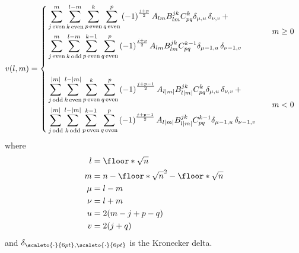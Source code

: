 \begin{align} 
    \label{eq:pn}
    v(l, m) &=
    \begin{dcases}
        \!\begin{aligned}%
            &
                \sum_{j\, \mathrm{even}}^m
                \sum_{k\, \mathrm{even}}^{l-m}
                \sum_{p\,\mathrm{even}}^{k}
                \sum_{q\,\mathrm{even}}^p
                \left(-1\right)^{\frac{j+p}{2}}
                A_{lm}
                B_{lm}^{jk}
                C_{pq}^{k}
                \delta_{\mu, u} \, \delta_{\nu, v}
            \, + \\
            &
                \sum_{j\, \mathrm{even}}^m
                \sum_{k\, \mathrm{odd}}^{l-m}
                \sum_{p\,\mathrm{even}}^{k - 1}
                \sum_{q\,\mathrm{even}}^p
                \left(-1\right)^{\frac{j+p}{2}}
                A_{lm}
                B_{lm}^{jk}
                C_{pq}^{k - 1}
                \delta_{\mu-1, u} \, \delta_{\nu-1, v}
       \end{aligned}
       &
       \quad m \ge 0 \\
       \\
       \!\begin{aligned}%
           &
               \sum_{j\, \mathrm{odd}}^{|m|}
               \sum_{k\, \mathrm{even}}^{l-|m|}
               \sum_{p\,\mathrm{even}}^{k}
               \sum_{q\,\mathrm{even}}^p
               \left(-1\right)^{\frac{j+p-1}{2}}
               A_{l|m|}
               B_{l|m|}^{jk}
               C_{pq}^{k}
               \delta_{\mu, u} \, \delta_{\nu, v}
           \, + \\
           &
               \sum_{j\, \mathrm{odd}}^{|m|}
               \sum_{k\, \mathrm{odd}}^{l-|m|}
               \sum_{p\,\mathrm{even}}^{k - 1}
               \sum_{q\,\mathrm{even}}^p
               \left(-1\right)^{\frac{j+p-1}{2}}
               A_{l|m|}
               B_{l|m|}^{jk}
               C_{pq}^{k - 1}
               \delta_{\mu-1, u} \, \delta_{\nu-1, v}
      \end{aligned}
      &
      \quad m < 0
   \end{dcases}
\end{align}
%
where
%
\begin{align}
    l &= \floor*{\sqrt{n}} \nonumber \\
    m &= n - \floor*{\sqrt{n}}^2 - \floor*{\sqrt{n}} \nonumber \\
    \mu &= l - m \nonumber \\
    \nu &= l + m \nonumber \\
    u &= 2(m - j + p - q) \nonumber \\
    v &= 2(j + q)
\end{align}
%
and $\delta_{{\scaleto{\cdot}{6pt},\scaleto{\cdot}{6pt}}}$ is the Kronecker
delta.
